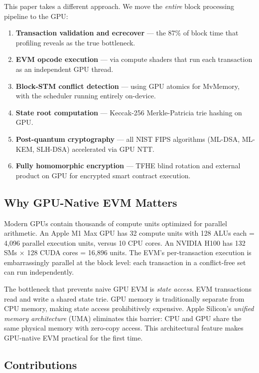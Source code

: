 \documentclass[11pt]{article}
\begin{document}
This paper takes a different approach. We move the \emph{entire} block processing
pipeline to the GPU:

\begin{enumerate}
\item \textbf{Transaction validation and ecrecover} --- the 87\% of block time that
      profiling reveals as the true bottleneck.
\item \textbf{EVM opcode execution} --- via compute shaders that run each transaction
      as an independent GPU thread.
\item \textbf{Block-STM conflict detection} --- using GPU atomics for MvMemory, with
      the scheduler running entirely on-device.
\item \textbf{State root computation} --- Keccak-256 Merkle-Patricia trie hashing on GPU.
\item \textbf{Post-quantum cryptography} --- all NIST FIPS algorithms (ML-DSA, ML-KEM,
      SLH-DSA) accelerated via GPU NTT.
\item \textbf{Fully homomorphic encryption} --- TFHE blind rotation and external product
      on GPU for encrypted smart contract execution.
\end{enumerate}

\subsection{Why GPU-Native EVM Matters}

Modern GPUs contain thousands of compute units optimized for parallel arithmetic. An
Apple M1 Max GPU has 32 compute units with 128 ALUs each = 4{,}096 parallel execution
units, versus 10 CPU cores. An NVIDIA H100 has 132 SMs $\times$ 128 CUDA cores = 16{,}896
units. The EVM's per-transaction execution is embarrassingly parallel at the block level:
each transaction in a conflict-free set can run independently.

The bottleneck that prevents naive GPU EVM is \emph{state access}. EVM transactions read
and write a shared state trie. GPU memory is traditionally separate from CPU memory,
making state access prohibitively expensive. Apple Silicon's \emph{unified memory
architecture} (UMA) eliminates this barrier: CPU and GPU share the same physical memory
with zero-copy access. This architectural feature makes GPU-native EVM practical for the
first time.

\subsection{Contributions}
\end{document}
